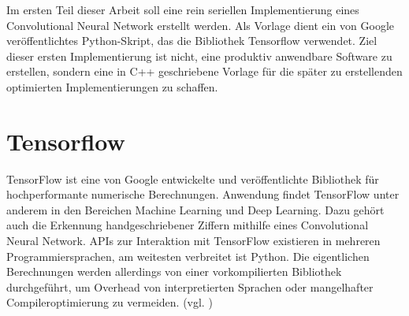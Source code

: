 \documentclass[../main.tex]{subfiles}
\begin{document}
Im ersten Teil dieser Arbeit soll eine rein seriellen Implementierung eines Convolutional Neural Network erstellt werden. Als Vorlage dient ein von Google veröffentlichtes Python-Skript, das die Bibliothek Tensorflow verwendet. Ziel dieser ersten Implementierung ist nicht, eine produktiv anwendbare Software zu erstellen, sondern eine in C++ geschriebene Vorlage für die später zu erstellenden optimierten Implementierungen zu schaffen. 

\section{Tensorflow}
TensorFlow ist eine von Google entwickelte und veröffentlichte Bibliothek für hochperformante numerische Berechnungen. Anwendung findet TensorFlow unter anderem in den Bereichen Machine Learning und Deep Learning. Dazu gehört auch die Erkennung handgeschriebener Ziffern mithilfe eines Convolutional Neural Network. APIs zur Interaktion mit TensorFlow existieren in mehreren Programmiersprachen, am weitesten verbreitet ist Python. Die eigentlichen Berechnungen werden allerdings von einer vorkompilierten Bibliothek durchgeführt, um Overhead von interpretierten Sprachen oder mangelhafter Compileroptimierung zu vermeiden. (vgl. \cite{tensorflowTutorial2})
\end{document}
